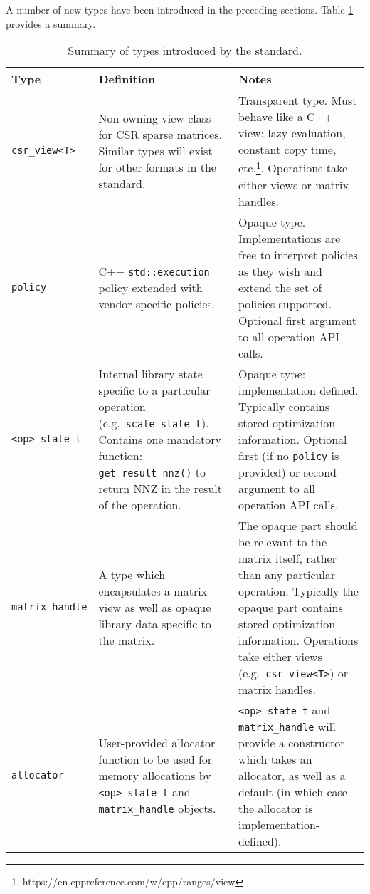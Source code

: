 \documentclass{article}
\begin{document}
\fi

\noindent

A number of new types have been introduced in the preceding sections. Table \ref{tab:newtypes} provides a summary.

\begin{table}[h]
    \centering
    \footnotesize
    \begin{tabular}{ l p{4.5cm} p{4.5cm} }%
    \toprule
    \textbf{Type} & \textbf{Definition} & \textbf{Notes}\\ 
    \midrule
        \texttt{csr\_view<T>} & Non-owning view class for CSR sparse matrices. Similar types will exist for other formats in the standard. & Transparent type. Must behave like a C++ view: lazy evaluation, constant copy time, etc.\footnote{https://en.cppreference.com/w/cpp/ranges/view}. Operations take either views or matrix handles. \\
    \midrule    
        \texttt{policy} & C++ \texttt{std::execution} policy extended with vendor specific policies. & Opaque type. Implementations are free to interpret policies as they wish and extend the set of policies supported. Optional first argument to all operation API calls. \\
    \midrule        
        \texttt{<op>\_state\_t} & Internal library state specific to a particular operation (e.g.~\texttt{scale\_state\_t}). Contains one mandatory function: \texttt{get\_result\_nnz()} to return NNZ in the result of the operation. & Opaque type: implementation defined. Typically contains stored optimization information. Optional first (if no \texttt{policy} is provided) or second argument to all operation API calls. \\    
    \midrule        
        \texttt{matrix\_handle} & A type which encapsulates a matrix view as well as opaque library data specific to the matrix. & The opaque part should be relevant to the matrix itself, rather than any particular operation. Typically the opaque part contains stored optimization information. Operations take either views (e.g.~\texttt{csr\_view<T>}) or matrix handles. \\ 
    \midrule        
        \texttt{allocator} & User-provided allocator function to be used for memory allocations by \texttt{<op>\_state\_t} and \texttt{matrix\_handle} objects. & \texttt{<op>\_state\_t} and \texttt{matrix\_handle} will provide a constructor which takes an allocator, as well as a default (in which case the allocator is implementation-defined). \\
    \bottomrule
    \end{tabular}
    \caption{Summary of types introduced by the standard.} 
    \label{tab:newtypes}
\end{table}
\end{document}
